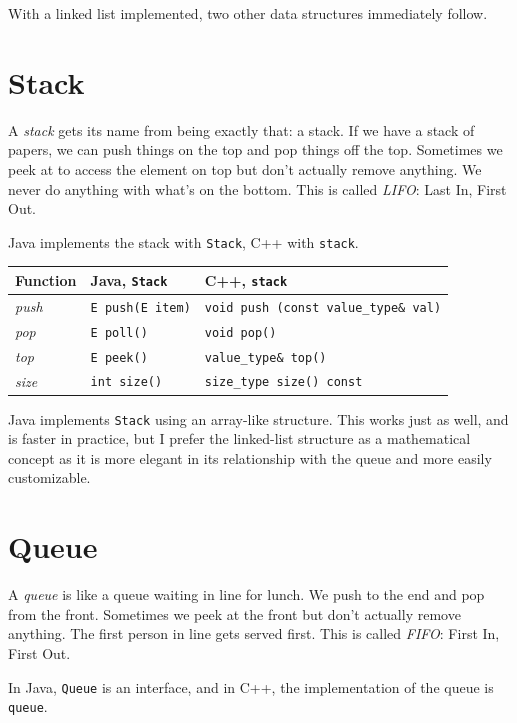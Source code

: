 With a linked list implemented, two other data structures immediately follow.

\section{Stack}

A \textit{stack} gets its name from being exactly that: a stack. If we have a stack of papers, we can push things on the top and pop things off the top. Sometimes we peek at to access the element on top but don't actually remove anything. We never do anything with what's on the bottom. This is called \textit{LIFO}: Last In, First Out.

Java implements the stack with \texttt{Stack}, C++ with \texttt{stack}.

\begin{center}
    \begin{tabular}{ p{5cm} p{5cm} p{5cm} }
	Function	&	Java, \texttt{Stack}	&	C++, \texttt{stack} \\
	\hline
	\textit{push}		&	\texttt{E push(E item)}	&	\texttt{void push (const value\_type\& val)} \\
    \textit{pop}			&	\texttt{E poll()}		&	\texttt{void pop()}	\\
	\textit{top}		&	\texttt{E peek()}		&	\texttt{value\_type\& top()}	\\
    \textit{size} & \texttt{int size()} & \texttt{size\_type size() const}
    \end{tabular}
\end{center}

Java implements \texttt{Stack} using an array-like structure. This works just as well, and is faster in practice, but I prefer the linked-list structure as a mathematical concept as it is more elegant in its relationship with the queue and more easily customizable.

\section{Queue}

A \textit{queue} is like a queue waiting in line for lunch. We push to the end and pop from the front. Sometimes we peek at the front but don't actually remove anything. The first person in line gets served first. This is called \textit{FIFO}: First In, First Out.

In Java, \texttt{Queue} is an interface, and in C++, the implementation of the queue is \texttt{queue}.

